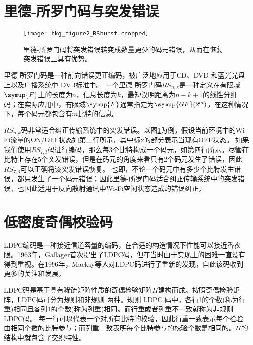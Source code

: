 \section{里德-所罗门码与突发错误}
\begin{figure}
	\centering
	\texttt{[image: bkg\_figure2\_RSburst-cropped]}
	\caption{里德-所罗门码将突发错误转变成数量更少的码元错误，从而在恢复突发错误上具有优势。}
	\label{fig:rscode}
\end{figure}
里德-所罗门码是一种前向错误更正编码，被广泛地应用于CD、DVD 和蓝光光盘上以及广播系统中 DVB标准中。 
一个里德-所罗门码$RS_{n,k}$是一种定义在有限域$\symup{F}$上的长度为$n$，信息长度为$k$，最短汉明距离为$n-k+1$的线性分组码；在实际应用中，有限域$\symup{F}$通常指定为$\symup{GF}(2^m)$，在这种情况下，每个码元都包含有$m$比特的信息。

$RS_{n,k}$码非常适合纠正传输系统中的突发错误。以图\ref{fig:rscode}为例，假设当前环境中的Wi-Fi流量的ON/OFF状态如第二行所示，其中标x的部分表示当现有OFF状态。
如果我们使用$RS_{7,3}$码进行编码，那么每3个比特构成一个码元，如第四行所示。尽管在比特上存在5个突发错误，但是在码元的角度来看只有2个码元发生了错误，因此$RS_{7,3}$可以正确将该突发错误恢复。
也即，不论一个码元中有多少个比特发生错误，都只发生了一个码元错误；因此里德-所罗门码适合纠正传输系统中的突发错误，也因此适用于反向散射通讯中Wi-Fi空闲状态造成的错误纠正。
\section{低密度奇偶校验码}

LDPC编码是一种接近信道容量的编码，在合适的构造情况下性能可以接近香农限。1963年，Gallager首次提出了LDPC码，但在当时由于实现上的困难一直没有得到重视。在1996年，Mackay等人对LDPC码进行了重新的发现，自此该码收到更多的关注和发展。

LDPC码是基于具有稀疏矩阵性质的奇偶检验矩阵$H$建构而成。按照奇偶检验矩阵，LDPC码可分为规则和非规则
两种。规则 LDPC 码中，各行1的个数(称为行重)相同且各列1的个数(称为列重)相同。而行重或者列重不一致就称为非规则LDPC码。
每一行可以代表一个对所有比特的校验，因此行重一致表示每个检验由相同个数的比特参与；而列重一致表明每个比特参与的校验个数是相同的。$H$的结构中就包含了交织特性。

